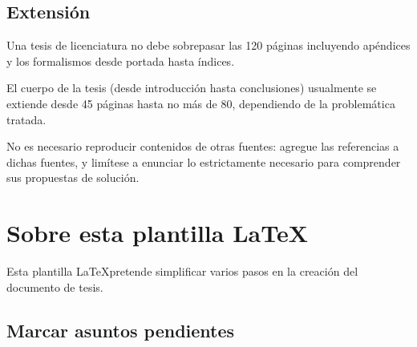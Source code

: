 

\subsection{Extensión}

Una tesis de licenciatura no debe sobrepasar las 120 páginas incluyendo
apéndices y los formalismos desde portada hasta índices.

El cuerpo de la tesis (desde introducción hasta conclusiones) usualmente se
extiende desde 45 páginas hasta no más de 80, dependiendo de la problemática
tratada.

No es necesario reproducir contenidos de otras fuentes: agregue las referencias
a dichas fuentes, y limítese a enunciar lo estrictamente necesario para
comprender sus propuestas de solución.

\section{Sobre esta plantilla \LaTeX}

Esta plantilla \LaTeX pretende simplificar varios pasos en la creación del
documento de tesis.

\subsection{Marcar asuntos pendientes}

